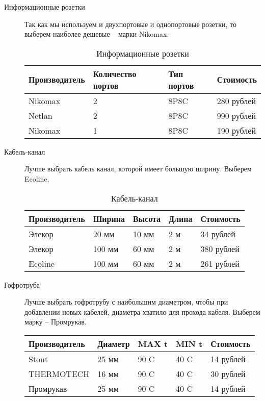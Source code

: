 \begin{description}
\item[Информационные розетки]
  Так как мы используем и двухпортовые и однопортовые розетки, то выберем наиболее дешевые – марки Nikomax.
\begin{table}[!htp]
    \centering
    \begin{tabular}{|l|l|l|l|}%
      \hline
      Производитель & Количество портов & Тип портов & Стоимость \\ \hline
      Nikomax & 2 & 8P8C & 280 рублей \\ \hline
      Netlan & 2 & 8P8C & 990 рублей \\ \hline
      Nikomax & 1 & 8P8C & 190 рублей \\ \hline
    \end{tabular}
    \caption{Информационные розетки}
    \label{table:infosocket}
  \end{table}
\item[Кабель-канал]
  Лучше выбрать кабель канал, которой имеет большую ширину. Выберем Ecoline.
\begin{table}[!htp]
    \centering
    \begin{tabular}{|l|l|l|l|l|}%
      \hline
      Производитель & Ширина & Высота & Длина & Стоимость \\ \hline
      Элекор & 20 мм & 10 мм & 2 м & 34 рублей \\ \hline
      Элекор & 100 мм & 60 мм & 2 м & 380 рублей \\ \hline
      Ecoline & 100 мм & 60 мм & 2 м & 261 рублей \\ \hline
    \end{tabular}
    \caption{Кабель-канал}
    \label{table:cabelcanal}
  \end{table}
\item[Гофротруба]
  Лучше выбрать гофротрубу с наибольшим диаметром, чтобы при добавлении новых кабелей, диаметра хватило для прохода кабеля. Выберем марку – Промрукав.
\begin{table}[!htp]
    \centering
    \begin{tabular}{|l|l|l|l|l|}%
      \hline
      Производитель & Диаметр & MAX t & MIN t & Стоимость \\ \hline
      Stout & 25 мм & 90 C & 40 C & 14 рублей \\ \hline
      THERMOTECH & 16 мм & 90 C & 40 C & 30 рублей \\ \hline
      Промрукав & 25 мм & 90 C & 40 C & 14 рублей \\ \hline

\end{tabular}
\end{table}
\end{description}
